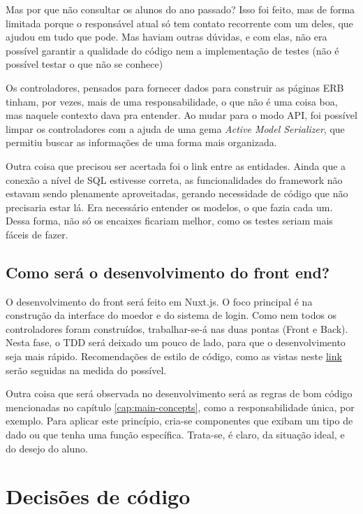 Mas por que não consultar os alunos do ano passado? Isso foi feito, mas de forma limitada porque o responsável atual
só tem contato recorrente com um deles, que ajudou em tudo que pode. Mas haviam outras dúvidas, e com elas, não
era possível garantir a qualidade do código nem a implementação de testes (não é possível testar o que não se
conhece)

Os controladores, pensados para fornecer dados para construir as páginas ERB tinham, por vezes, mais de uma
responsabilidade, o que não é uma coisa boa, mas naquele contexto dava pra entender. Ao mudar para o modo API, foi
possível limpar os controladores com a ajuda de uma gema \emph{Active Model Serializer}, que permitiu buscar as
informações de uma forma mais organizada.

Outra coisa que precisou ser acertada foi o link entre as entidades. Ainda que a conexão a nível de SQL estivesse
correta, as funcionalidades do framework não estavam sendo plenamente aproveitadas, gerando necessidade de código
que não precisaria estar lá. Era necessário entender os modelos, o que fazia cada um. Dessa forma, não só os
encaixes ficariam melhor, como os testes seriam mais fáceis de fazer.

\subsection{Como será o desenvolvimento do front end?}\label{subsec:desenvolvimento}

O desenvolvimento do front será feito em Nuxt.js. O foco principal é na construção da interface do moedor 
e do sistema de login. Como nem todos os controladores foram construídos, trabalhar-se-á nas duas pontas
(Front e Back). Nesta fase, o TDD será deixado um pouco de lado, para que o desenvolvimento seja mais rápido.
Recomendações de estilo de código, como as vistas neste \href{https://br.vuejs.org/v2/style-guide/index.html}{link} serão seguidas na medida do possível.

Outra coisa que será observada no desenvolvimento será as regras de bom código mencionadas no capítulo 
\ref{cap:main-concepts}, como a responsabilidade única, por exemplo. Para aplicar este princípio, cria-se 
componentes que exibam um tipo de dado ou que tenha uma função específica. Trata-se, é claro, da situação
ideal, e do desejo do aluno.

\section{Decisões de código}\label{sec:decisoes}

